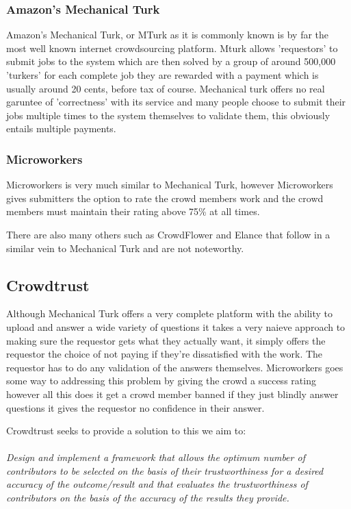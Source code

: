 \documentclass[11pt]{article}
\begin{document}
\subsubsection{Amazon's Mechanical Turk}
Amazon's Mechanical Turk, or MTurk as it is commonly known is by far the most well known
internet crowdsourcing platform. Mturk allows 'requestors' to submit jobs to the 
system which are then solved by a group of around 500,000 'turkers' for each 
complete job they are rewarded with a payment which is usually around 20 cents, 
before tax of course. Mechanical turk offers no real garuntee of 'correctness' 
with its service and many people choose to submit their jobs multiple times to the
system themselves to validate them, this obviously entails multiple payments.

\subsubsection{Microworkers}
Microworkers is very much similar to Mechanical Turk, however Microworkers gives submitters the 
option to rate the crowd members work and the crowd members must maintain their rating above 75\% at
all times. 

There are also many others such as CrowdFlower and Elance that follow in a similar vein to Mechanical Turk and
are not noteworthy.

\subsection{Crowdtrust}
Although Mechanical Turk offers a very complete platform with the ability to upload and answer a wide variety of questions
it takes a very naieve approach to making sure the requestor gets what they actually want, it simply offers the requestor
the choice of not paying if they're dissatisfied with the work. The requestor has to do any validation of the answers themselves. 
Microworkers goes some way to addressing this problem by giving the crowd a success rating however all this does it get a crowd
member banned if they just blindly answer questions it gives the requestor no confidence in their answer.

Crowdtrust seeks to provide a solution to this we aim to:
\\
\\
\emph{Design and implement a framework that allows the optimum number of contributors to be selected on the basis of their trustworthiness 
for a desired accuracy of the outcome/result and that evaluates the trustworthiness of contributors on the basis of the accuracy of the 
results they provide.}
\end{document}
